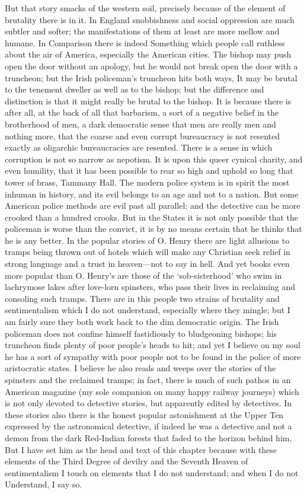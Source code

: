\documentclass{book}
\begin{document}
But that story smacks of the western soil, precisely because of the element of brutality there is in it. In England snobbishness and social oppression are much subtler and softer; the manifestations of them at least are more mellow and humane. In Comparison there is indeed Something which people call ruthless about the air of America, especially the American cities. The bishop may push open the door without an apology, but he would not break open the door with a truncheon; but the Irish policeman’s truncheon hits both ways, It may be brutal to the tenement dweller as well as to the bishop; but the difference and distinction is that it might really be brutal to the bishop. It is because there is after all, at the back of all that barbarism, a sort of a negative belief in the brotherhood of men, a dark democratic sense that men are really men and nothing more, that the coarse and even corrupt bureaucracy is not resented exactly as oligarchic bureaucracies are resented. There is a sense in which corruption is not so narrow as nepotism. It is upon this queer cynical charity, and even humility, that it has been possible to rear so high and uphold so long that tower of brass, Tammany Hall. The modern police system is in spirit the most inhuman in history, and its evil belongs to an age and not to a nation. But some American police methods are evil past all parallel; and the detective can be more crooked than a hundred crooks. But in the States it is not only possible that the policeman is worse than the convict, it is by no means certain that he thinks that he is any better. In the popular stories of O. Henry there are light allusions to tramps being thrown out of hotels which will make any Christian seek relief in strong language and a trust in heaven—not to say in hell. And yet books even more popular than O. Henry’s are those of the ‘sob-sisterhood’ who swim in lachrymose lakes after love-lorn spinsters, who pass their lives in reclaiming and consoling such tramps. There are in this people two strains of brutality and sentimentalism which I do not understand, especially where they mingle; but I am fairly sure they both work back to the dim democratic origin. The Irish policeman does not confine himself fastidiously to bludgeoning bishops; his truncheon finds plenty of poor people’s heads to hit; and yet I believe on my soul he has a sort of sympathy with poor people not to be found in the police of more aristocratic states. I believe he also reads and weeps over the stories of the spinsters and the reclaimed tramps; in fact, there is much of such pathos in an American magazine (my sole companion on many happy railway journeys) which is not only devoted to detective stories, but apparently edited by detectives. In these stories also there is the honest popular astonishment at the Upper Ten expressed by the astronomical detective, if indeed he was a detective and not a demon from the dark Red-Indian forests that faded to the horizon behind him. But I have set him as the head and text of this chapter because with these elements of the Third Degree of devilry and the Seventh Heaven of sentimentalism I touch on elements that I do not understand; and when I do not Understand, I say so.
\end{document}
